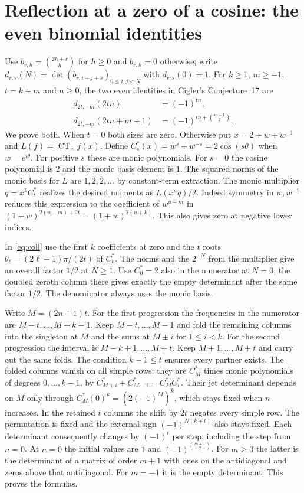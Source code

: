 \documentclass[11pt,a4paper]{article}
\begin{document}
\section{Reflection at a zero of a cosine: the even binomial identities}
Use $b_{r,h}=\binom{2h+r}{h}$ for $h\ge0$ and $b_{r,h}=0$ otherwise; write
$d_{r,s}(N)=\det(b_{r,i+j+s})_{0\le i,j<N}$ with $d_{r,s}(0)=1$.
For $k\ge1$, $m\ge-1$, $t=k+m$ and $n\ge0$, the two even identities in Cigler's Conjecture~17 are
\begin{align*}
d_{2t,-m}(2tn)&=(-1)^{tn},\\
d_{2t,-m}(2tn+m+1)&=(-1)^{tn+\binom{m+1}{2}}.
\end{align*}
We prove both. When $t=0$ both sizes are zero. Otherwise put $x=2+w+w^{-1}$ and $L(f)=\operatorname{CT}_w f(x)$. Define $C_s^{*}(x)=w^s+w^{-s}=2\cos(s\theta)$ when $w=e^{i\theta}$. For positive $s$ these are monic polynomials. For $s=0$ the cosine polynomial is $2$ and the monic basis element is $1$. The squared norms of the monic basis for $L$ are $1,2,2,\ldots$ by constant-term extraction.
The monic multiplier $q=x^k C_t^{*}$ realizes the desired moments as $L(x^u q)/2$. Indeed symmetry in $w,w^{-1}$ reduces this expression to the coefficient of $w^{u-m}$ in $(1+w)^{2(u-m)+2t}=(1+w)^{2(u+k)}$. This also gives zero at negative lower indices.

In \eqref{eq:coll} use the first $k$ coefficients at zero and the $t$ roots $\theta_\ell=(2\ell-1)\pi/(2t)$ of $C_t^{*}$. The norms and the $2^{-N}$ from the multiplier give an overall factor $1/2$ at $N\ge1$. Use $C_0^{*}=2$ also in the numerator at $N=0$; the doubled zeroth column there gives exactly the empty determinant after the same factor $1/2$. The denominator always uses the monic basis.

Write $M=(2n+1)t$. For the first progression the frequencies in the numerator are $M-t,\ldots,M+k-1$. Keep $M-t,\ldots,M-1$ and fold the remaining columns into the singleton at $M$ and the sums at $M\pm i$ for $1\le i<k$. For the second progression the interval is $M-k+1,\ldots,M+t$. Keep $M+1,\ldots,M+t$ and carry out the same folds. The condition $k-1\le t$ ensures every partner exists. The folded columns vanish on all simple rows; they are $C_M^{*}$ times monic polynomials of degrees $0,\ldots,k-1$, by $C_{M+i}^{*}+C_{M-i}^{*}=C_M^{*}C_i^{*}$. Their jet determinant depends on $M$ only through $C_M^{*}(0)^k=(2(-1)^M)^k$, which stays fixed when $n$ increases. In the retained $t$ columns the shift by $2t$ negates every simple row. The permutation is fixed and the external sign $(-1)^{N(k+t)}$ also stays fixed. Each determinant consequently changes by $(-1)^t$ per step, including the step from $n=0$. At $n=0$ the initial values are $1$ and $(-1)^{\binom{m+1}{2}}$. For $m\ge0$ the latter is the determinant of a matrix of order $m+1$ with ones on the antidiagonal and zeros above that antidiagonal. For $m=-1$ it is the empty determinant. This proves the formulas.
\end{document}
